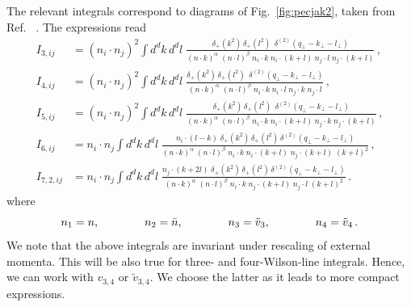 \documentclass[a4paper,11pt]{report}
\numberwithin{equation}{section}
\begin{document}
The relevant integrals correspond to diagrams of Fig.~\ref{fig:pecjak2}, taken
from Ref. ~\cite{Ferroglia:2012uy}. 
%
The expressions read
%
\begin{subequations}
  \label{eq:2WLIset}
  \begin{align}
    I_{3, ij} &= 
    (n_i \cdot n_j)^2
    \int d^d k\, d^d l\; 
    \frac{\delta_+(k^2) \, \delta_+(l^2)\,
      \; \delta^{(2)}(q_\perp-k_\perp-l_\perp)}
      {(n \cdot k)^\alpha\; (n \cdot l)^\beta \; 
      n_i \cdot k \; n_i \cdot
      (k+l) \; n_j \cdot l \; n_j \cdot (k+l)} \, ,
    \\[0.7em]
    I_{4, ij} &= 
    (n_i \cdot n_j)^2
    \int d^d k\, d^d l\; 
    \frac{\delta_+(k^2) \, \delta_+(l^2) \,
      \; \delta^{(2)}(q_\perp-k_\perp-l_\perp)}
      {(n \cdot k)^\alpha\; (n \cdot l)^\beta \;
      n_i \cdot k \; n_i \cdot l \;
      n_j \cdot k \; n_j \cdot l} \, ,
    \\[0.7em]
    I_{5, ij} &=
    (n_i \cdot n_j)^2
    \int d^d k\, d^d l\; 
    \frac{\delta_+(k^2) \, \delta_+(l^2) \,
      \; \delta^{(2)}(q_\perp-k_\perp-l_\perp)}
      {(n \cdot k)^\alpha\; (n \cdot l)^\beta  \;
      n_i \cdot k \; n_i \cdot
      (k+l) \; n_j \cdot k \; n_j \cdot (k+l)} \, , 
    \\[0.7em]
    \label{eq:I6ij}
    I_{6,ij} &=
    n_i \cdot n_j
    \int d^d k\, d^d l\; 
    \frac{n_i \cdot (l-k) \;\delta_+(k^2) \, \delta_+(l^2) \, 
     \delta^{(2)}(q_\perp-k_\perp-l_\perp)}
      {(n \cdot k)^\alpha\; (n \cdot l)^\beta  \;
      n_i \cdot k \; n_i \cdot (k+l) \; n_j \cdot (k+l) \; (k+l)^2} \, , 
    \\[0.7em]
    \label{eq:I72ij}
    I_{7,2, ij} &=
    n_i \cdot n_j
    \int d^d k\, d^d l\; 
    \frac{n_j \cdot (k+2l) \; \delta_+(k^2) \, \delta_+(l^2) \,
      \delta^{(2)}(q_\perp-k_\perp-l_\perp)}
      {(n \cdot k)^\alpha\; (n \cdot l)^\beta  \;
      n_i \cdot k \; n_j \cdot (k+l) \; n_j \cdot l \; (k+l)^2} \, .
  \end{align}
\end{subequations}
%
where
\begin{equation}
  n_1 = n,     \qquad \qquad
  n_2 = \bar{n}, \qquad \qquad
  n_3 = \tilde v_3,   \qquad \qquad
  n_4 = \tilde v_4\,.
  \label{eq:nnlo-external-particles}
\end{equation}
%
We note that the above integrals are invariant under rescaling of external
momenta. This will be also true for three- and four-Wilson-line integrals.
Hence, we can work with $v_{3,4}$ or $\tilde v_{3,4}$. We choose the latter as
it leads to more compact expressions.
 
\end{document}
